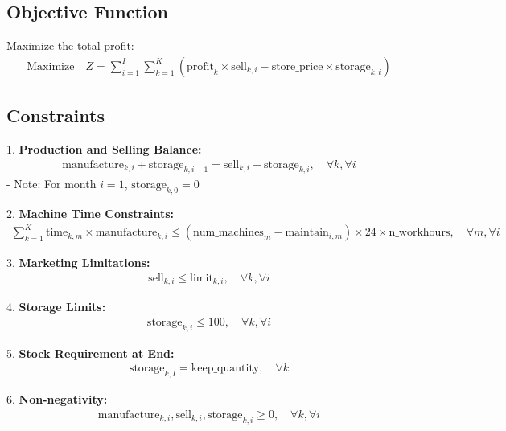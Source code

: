 \documentclass{article}
\begin{document}
\subsection*{Objective Function}
Maximize the total profit:
\begin{align*}
    \text{Maximize} \quad Z = \sum_{i=1}^{I} \sum_{k=1}^{K} \left( \text{profit}_k \times \text{sell}_{k, i} - \text{store\_price} \times \text{storage}_{k, i} \right)
\end{align*}

\subsection*{Constraints}

1. \textbf{Production and Selling Balance:}
\begin{align*}
    \text{manufacture}_{k, i} + \text{storage}_{k, i-1} = \text{sell}_{k, i} + \text{storage}_{k, i}, \quad \forall k, \forall i
\end{align*}
- Note: For month $i = 1$, $\text{storage}_{k, 0} = 0$

2. \textbf{Machine Time Constraints:}
\begin{align*}
    \sum_{k=1}^{K} \text{time}_{k, m} \times \text{manufacture}_{k, i} \leq (\text{num\_machines}_m - \text{maintain}_{i, m}) \times 24 \times \text{n\_workhours}, \quad \forall m, \forall i
\end{align*}

3. \textbf{Marketing Limitations:}
\begin{align*}
    \text{sell}_{k, i} \leq \text{limit}_{k, i}, \quad \forall k, \forall i
\end{align*}

4. \textbf{Storage Limits:}
\begin{align*}
    \text{storage}_{k, i} \leq 100, \quad \forall k, \forall i
\end{align*}

5. \textbf{Stock Requirement at End:}
\begin{align*}
    \text{storage}_{k, I} = \text{keep\_quantity}, \quad \forall k
\end{align*}

6. \textbf{Non-negativity:}
\begin{align*}
    \text{manufacture}_{k, i}, \text{sell}_{k, i}, \text{storage}_{k, i} \geq 0, \quad \forall k, \forall i
\end{align*}
\end{document}
